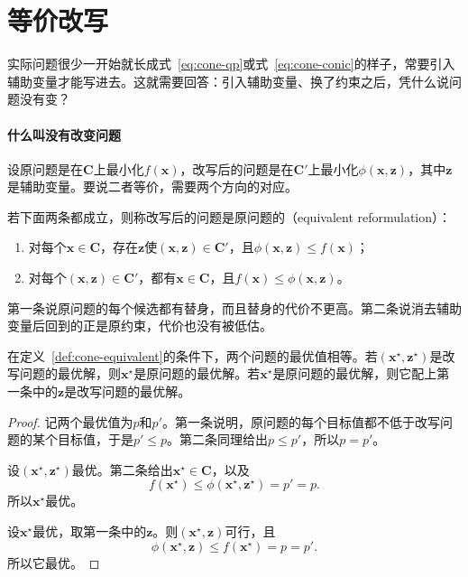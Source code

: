 \section{等价改写}
\label{sec:cone-rewrite}

实际问题很少一开始就长成式~\eqref{eq:cone-qp}或式~\eqref{eq:cone-conic}的样子，常要引入辅助变量才能写进去。这就需要回答：引入辅助变量、换了约束之后，凭什么说问题没有变？

\paragraph{什么叫没有改变问题}
设原问题是在$\bm{C}$上最小化$f(\bm{x})$，改写后的问题是在$\bm{C}'$上最小化$\phi(\bm{x},\bm{z})$，其中$\bm{z}$是辅助变量。要说二者等价，需要两个方向的对应。

\begin{definition}[等价改写]
\label{def:cone-equivalent}
若下面两条都成立，则称改写后的问题是原问题的（equivalent reformulation）：
\begin{enumerate}
 \item 对每个$\bm{x}\in\bm{C}$，存在$\bm{z}$使$(\bm{x},\bm{z})\in\bm{C}'$，且$\phi(\bm{x},\bm{z})\leq f(\bm{x})$；
 \item 对每个$(\bm{x},\bm{z})\in\bm{C}'$，都有$\bm{x}\in\bm{C}$，且$f(\bm{x})\leq\phi(\bm{x},\bm{z})$。
\end{enumerate}
\end{definition}

第一条说原问题的每个候选都有替身，而且替身的代价不更高。第二条说消去辅助变量后回到的正是原约束，代价也没有被低估。

\begin{theorem}[等价改写保持最优值与最优解]
\label{thm:cone-equivalent}
在定义~\ref{def:cone-equivalent}的条件下，两个问题的最优值相等。若$(\bm{x}^\star,\bm{z}^\star)$是改写问题的最优解，则$\bm{x}^\star$是原问题的最优解。若$\bm{x}^\star$是原问题的最优解，则它配上第一条中的$\bm{z}$是改写问题的最优解。
\end{theorem}

\begin{proof}
记两个最优值为$p$和$p'$。第一条说明，原问题的每个目标值都不低于改写问题的某个目标值，于是$p'\leq p$。第二条同理给出$p\leq p'$，所以$p=p'$。

设$(\bm{x}^\star,\bm{z}^\star)$最优。第二条给出$\bm{x}^\star\in\bm{C}$，以及
\[
 f(\bm{x}^\star)\leq\phi(\bm{x}^\star,\bm{z}^\star)=p'=p.
\]
所以$\bm{x}^\star$最优。

设$\bm{x}^\star$最优，取第一条中的$\bm{z}$。则$(\bm{x}^\star,\bm{z})$可行，且
\[
 \phi(\bm{x}^\star,\bm{z})\leq f(\bm{x}^\star)=p=p'.
\]
所以它最优。
\end{proof}

